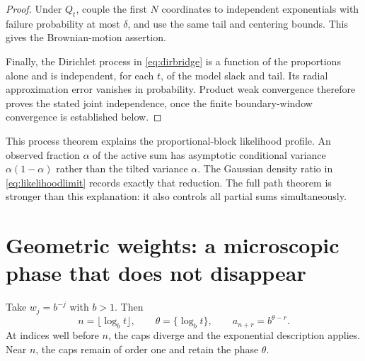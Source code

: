 \documentclass[11pt,letterpaper]{article}
\numberwithin{equation}{section}
\theoremstyle{definition}
\theoremstyle{remark}
\begin{document}
\begin{proof}
Under $Q_t$, couple the first $N$ coordinates to independent exponentials
with failure probability at most $\delta$, and use the same tail and centering
bounds. This gives the Brownian-motion assertion.

Finally, the Dirichlet process in \eqref{eq:dirbridge} is a function of the
proportions alone and is independent, for each $t$, of the model slack and
tail. Its radial approximation error vanishes in probability. Product weak
convergence therefore proves the stated joint independence, once the finite
boundary-window convergence is established below.
\end{proof}

This process theorem explains the proportional-block likelihood profile.
An observed fraction $\alpha$ of the active sum has asymptotic conditional
variance $\alpha(1-\alpha)$ rather than the tilted variance $\alpha$.
The Gaussian density ratio in \eqref{eq:likelihoodlimit} records exactly
that reduction. The full path theorem is stronger than this explanation:
it also controls all partial sums simultaneously.

\section{Geometric weights: a microscopic phase that does not disappear}
\label{sec:phase}

Take $w_j=b^{-j}$ with $b>1$. Then
\begin{equation}
 n=\lfloor\log_b t\rfloor,\qquad
 \theta=\{\log_b t\},\qquad
 a_{n+r}=b^{\theta-r}.
 \label{eq:phase}
\end{equation}
At indices well before $n$, the caps diverge and the exponential description
applies. Near $n$, the caps remain of order one and retain the phase $\theta$.
\end{document}
